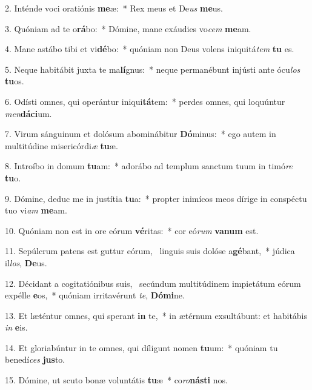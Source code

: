 2. Inténde voci oratiónis \textbf{me}æ:~*  Rex meus et De\textit{us} \textbf{me}us.\

3. Quóniam ad te o\textbf{rá}bo:~*  Dómine, mane exáudies vo\textit{cem} \textbf{me}am.\

4. Mane astábo tibi et vi\textbf{dé}bo:~*  quóniam non Deus volens iniquitá\textit{tem} \textbf{tu} es.\

5. Neque habitábit juxta te ma\textbf{lí}gnus:~*  neque permanébunt injústi ante ócu\textit{los} \textbf{tu}os.\

6. Odísti omnes, qui operántur iniqui\textbf{tá}tem:~*  perdes omnes, qui loquúntur \textit{men}\textbf{dá}\textbf{ci}um.\

7. Virum sánguinum et dolósum abominábitur \textbf{Dó}minus:~*  ego autem in multitúdine misericórdi\textit{æ} \textbf{tu}æ.\

8. Introíbo in domum \textbf{tu}am:~*  adorábo ad templum sanctum tuum in timó\textit{re} \textbf{tu}o.\

9. Dómine, deduc me in justítia \textbf{tu}a:~*  propter inimícos meos dírige in conspéctu tuo vi\textit{am} \textbf{me}am.\

10. Quóniam non est in ore eórum \textbf{vé}ritas:~*  cor eó\textit{rum} \textbf{va}\textbf{num} est.\

11. Sepúlcrum patens est guttur eórum, \dag\  linguis suis dolóse a\textbf{gé}bant,~*  júdica il\textit{los}, \textbf{De}us.\

12. Décidant a cogitatiónibus suis, \dag\  secúndum multitúdinem impietátum eórum expélle \textbf{e}os,~*  quóniam irritavérunt \textit{te}, \textbf{Dó}\textbf{mi}ne.\

13. Et læténtur omnes, qui sperant \textbf{in} te,~*  in ætérnum exsultábunt: et habitábis \textit{in} \textbf{e}is.\

14. Et gloriabúntur in te omnes, qui díligunt nomen \textbf{tu}um:~*  quóniam tu benedí\textit{ces} \textbf{jus}to.\

15. Dómine, ut scuto bonæ voluntátis \textbf{tu}æ~*  co\textit{ro}\textbf{nás}\textbf{ti} nos.\

